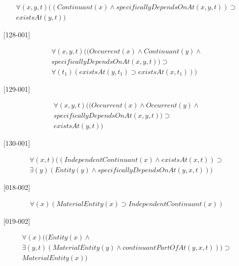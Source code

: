 \documentclass{article}
\begin{document}
\begin{flushright}
[127-001] 

\begin{equation}
\begin{split}
{\forall}(x, y, t)((Continuant(x) \wedge specificallyDependsOnAt(x, y, t)) \supset \\
existsAt(y, t))
\end{split}
\end{equation}

[128-001] 

\begin{equation}
\begin{split}
{\forall}(x, y, t)((Occurrent(x) \wedge Continuant(y) \wedge \\
specificallyDependsOnAt(x, y, t)) \supset \\
{\forall}(t_1)(existsAt(y, t_1) \supset existsAt(x, t_1)))
\end{split}
\end{equation}

[129-001] 

\begin{equation}
\begin{split}
{\forall}(x, y, t)((Occurrent(x) \wedge Occurrent(y) \wedge \\
specificallyDependsOnAt(x, y, t)) \supset \\
existsAt(y, t))
\end{split}
\end{equation}

[130-001] 

\begin{equation}
\begin{split}
{\forall}(x, t)((IndependentContinuant(x) \wedge existsAt(x, t)) \supset \\
{\exists}(y)(Entity(y) \wedge specificallyDependsOnAt(y, x, t)))
\end{split}
\end{equation}

[018-002] 

\begin{equation}
\begin{split}
{\forall}(x)(MaterialEntity(x) \supset IndependentContinuant(x))
\end{split}
\end{equation}

[019-002] 

\begin{equation}
\begin{split}
{\forall}(x)((Entity(x) \wedge \\
{\exists}(y, t)(MaterialEntity(y) \wedge continuantPartOfAt(y, x, t))) \supset \\
MaterialEntity(x))
\end{split}
\end{equation}


\end{flushright}
\end{document}
